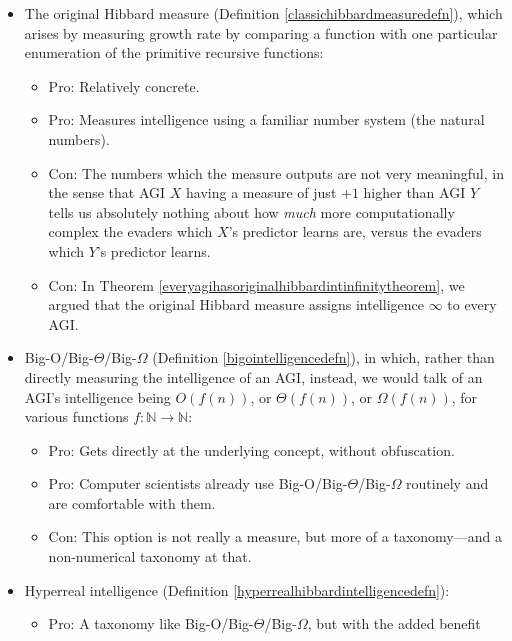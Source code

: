 \documentclass{article}
\begin{document}
\begin{itemize}
    \item
    The original Hibbard measure (Definition \ref{classichibbardmeasuredefn}),
    which arises by measuring growth rate by comparing
    a function with one particular enumeration \cite{liu1960enumeration} of the primitive
    recursive functions:
    \begin{itemize}
        \item
        Pro: Relatively concrete.
        \item
        Pro: Measures intelligence using a familiar number system (the natural numbers).
        \item
        Con: The numbers which the measure outputs are not very meaningful, in the sense
        that AGI $X$ having a measure of just $+1$ higher than AGI $Y$ tells us absolutely
        nothing about how \emph{much} more computationally complex the evaders which $X$'s
        predictor learns are, versus the evaders which $Y$'s predictor learns.
        \item
        Con: In Theorem \ref{everyagihasoriginalhibbardintinfinitytheorem}, we argued
        that the original Hibbard measure assigns intelligence $\infty$ to every AGI.
    \end{itemize}
    \item
    Big-O/Big-$\Theta$/Big-$\Omega$ (Definition \ref{bigointelligencedefn}),
    in which, rather than directly measuring the intelligence of an AGI, instead, we
    would talk of an AGI's intelligence being $O(f(n))$, or $\Theta(f(n))$, or
    $\Omega(f(n))$, for various functions $f:\mathbb N\to\mathbb N$:
    \begin{itemize}
        \item
        Pro: Gets directly at the underlying concept, without obfuscation.
        \item
        Pro: Computer scientists already use Big-O/Big-$\Theta$/Big-$\Omega$ routinely
        and are comfortable with them.
        \item
        Con: This option is not really a measure, but more of a taxonomy---and a non-numerical
        taxonomy at that.
    \end{itemize}
    \item
    Hyperreal intelligence (Definition \ref{hyperrealhibbardintelligencedefn}):
    \begin{itemize}
        \item
        Pro: A taxonomy like Big-O/Big-$\Theta$/Big-$\Omega$, but with the added benefit

\end{itemize}
\end{itemize}
\end{document}
